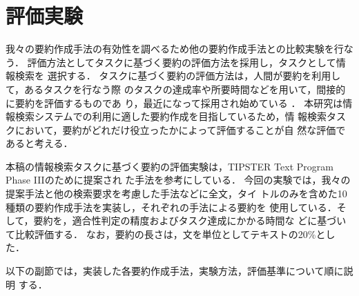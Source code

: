 \section{評価実験}\label{sec:examination}
我々の要約作成手法の有効性を調べるため他の要約作成手法との比較実験を行なう．
評価方法としてタスクに基づく要約の評価方法を採用し，タスクとして情報検索を
選択する．
タスクに基づく要約の評価方法は，人間が要約を利用して，あるタスクを行なう際
のタスクの達成率や所要時間などを用いて，間接的に要約を評価するものであ
り，最近になって採用され始めている
\cite{Oku:99:a,Jing:98,Mani:98:a,tombros:98:b}．
本研究は情報検索システムでの利用に適した要約作成を目指しているため，情
報検索タスクにおいて，要約がどれだけ役立ったかによって評価することが自
然な評価であると考える．

本稿の情報検索タスクに基づく要約の評価実験は，TIPSTER Text Program
Phase IIIのために提案され
た手法\cite{Hand:97}を参考にしている．
今回の実験では，我々の提案手法と他の検索要求を考慮した手法などに全文，タイ
トルのみを含めた10種類の要約作成手法を実装し，それぞれの手法による要約を
使用している．そして，要約を，適合性判定の精度およびタスク達成にかかる時間な
どに基づいて比較評価する．
なお，要約の長さは，文を単位としてテキストの20\%とした．

以下の副節では，実装した各要約作成手法，実験方法，評価基準について順に説明
する．


